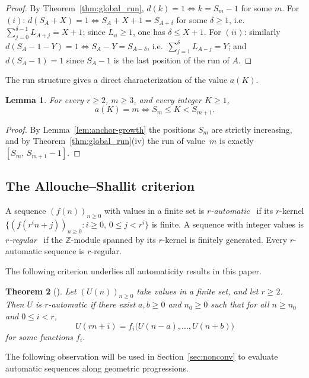\documentclass[12pt]{article}
\newtheorem{theorem}{Theorem}[section]
\newtheorem{lemma}[theorem]{Lemma}
\theoremstyle{definition}
\theoremstyle{remark}
\begin{document}
\begin{proof}
By Theorem~\ref{thm:global_run}, $d(k)=1\iff k=S_m-1$ for some $m$.
For $(i)$: $d(S_A+X)=1\iff S_A+X+1=S_{A+\delta}$ for some $\delta\ge 1$,
i.e.\ $\sum_{j=0}^{\delta-1}L_{A+j}=X+1$; since $L_u\ge 1$, one has $\delta\le X+1$.
For $(ii)$: similarly $d(S_A-1-Y)=1\iff S_A-Y=S_{A-\delta}$,
i.e.\ $\sum_{j=1}^{\delta}L_{A-j}=Y$; and $d(S_A-1)=1$ since $S_A-1$ is the last
position of the run of $A$.
\end{proof}

The run structure gives a direct characterization of the value $a(K)$.

\begin{lemma}\label{lem:anchor-characterization}
For every $r\ge 2$, $m\ge 3$, and every integer $K\ge 1$,
\[
  a(K)=m \iff S_m \le K < S_{m+1}.
\]
\end{lemma}

\begin{proof}
By Lemma~\ref{lem:anchor-growth} the positions $S_m$ are strictly increasing,
and by Theorem~\ref{thm:global_run}(iv) the run of value~$m$ is exactly
$[S_m,\,S_{m+1}-1]$.
\end{proof}


\subsection{The Allouche--Shallit criterion}

A sequence $(f(n))_{n\ge 0}$ with values in a finite set is \emph{$r$-automatic}~\cite{Cobham}
if its $r$-kernel $\{(f(r^in+j))_{n\ge 0}:i\ge 0,\,0\le j<r^i\}$ is finite.
A sequence with integer values is \emph{$r$-regular}~\cite{AS92} if the $\mathbb{Z}$-module
spanned by its $r$-kernel is finitely generated. Every $r$-automatic sequence is $r$-regular.

The following criterion underlies all automaticity results in this paper.

\begin{theorem}[\cite{AS12}]\label{thm:AS}
Let $(U(n))_{n\ge 0}$ take values in a finite set, and let $r\ge 2$.
Then $U$ is $r$-automatic if there exist $a,b\ge 0$ and $n_0\ge 0$ such that
for all $n\ge n_0$ and $0\le i<r$,
\[
  U(rn+i) = f_i\bigl(U(n-a),\ldots,U(n+b)\bigr)
\]
for some functions $f_i$.
\end{theorem}

The following observation will be used in Section~\ref{sec:nonconv}
to evaluate automatic sequences along geometric progressions.
\end{document}
